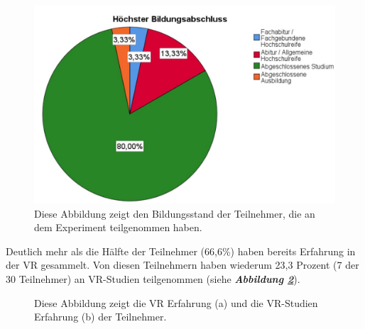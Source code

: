 \documentclass[a4paper,11pt]{article}%
\renewcommand{\\}{\vspace*{0.5\baselineskip} \newline}
\begin{document}
{\begin{figure}[H]
		\begin{footnotesize}
		\centering
			\includegraphics[scale=0.4]{Abbildungen/Demographie/teilnehmerBildungsstand.JPG}
			\caption[Der Bildungsstand der Teilnehmer]{Diese Abbildung zeigt den Bildungsstand der Teilnehmer, die an dem Experiment teilgenommen haben.}
			\label{teilnehmerBildungsstand}
		\end{footnotesize}
	\end{figure}

Deutlich mehr als die Hälfte der Teilnehmer (66,6\%) haben bereits Erfahrung in der VR gesammelt. Von diesen Teilnehmern haben wiederum 23,3 Prozent (7 der 30 Teilnehmer) an VR-Studien teilgenommen (siehe \textbf{\textit{Abbildung \ref{teilnehmerVRErfahrungen}}}).

\begin{figure}[h]
  \centering
  \qquad
  \caption[Die vorhandene VR-Erfahrung der Teilnehmer]{Diese Abbildung zeigt die VR Erfahrung (a) und die VR-Studien Erfahrung (b) der Teilnehmer.}
  \label{teilnehmerVRErfahrungen}
\end{figure}

}
\end{document}
